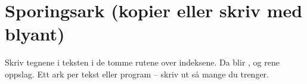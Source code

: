 \documentclass[10pt,a4paper]{article}
\begin{document}
\section*{Sporingsark (kopier eller skriv med blyant)}
Skriv tegnene i teksten i de tomme rutene over indeksene. Da blir ,  og  rene oppslag.
Ett ark per tekst eller program -- skriv ut så mange du trenger.

\medskip
\sporingsarkinnhold
\end{document}
